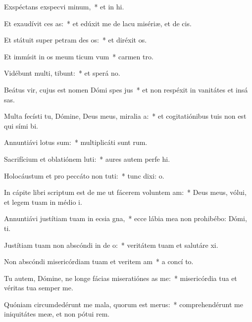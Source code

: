 \item Exspéctans exspecvi minum,~* et in hi.
\item Et exaudívit ces as:~* et edúxit me de lacu misériæ, et de  cis.
\item Et státuit super petram des os:~* et diréxit  os.
\item Et immísit in os meum ticum vum~* carmen  tro.
\item Vidébunt multi,  tibunt:~* et sperá  no.
\item Beátus vir, cujus est nomen Dómi spes jus~* et non respéxit in vanitátes et insá sas.
\item Multa fecísti tu, Dómine, Deus meus, miralia a:~* et cogitatiónibus tuis non est qui sími  bi.
\item Annuntiávi  lotus sum:~* multiplicáti sunt  rum.
\item Sacrifícium et oblatiónem luti:~* aures autem perfe hi.
\item Holocáustum et pro peccáto non tuti:~* tunc dixi:  o.
\item In cápite libri scriptum est de me ut fácerem voluntem am:~* Deus meus, vólui, et legem tuam in médio  i.
\item Annuntiávi justítiam tuam in ecsia gna,~* ecce lábia mea non prohibébo: Dómi,  ti.
\item Justítiam tuam non abscóndi in de o:~* veritátem tuam et salutáre  xi.
\item Non abscóndi misericórdiam tuam et veritem am~* a concí to.
\item Tu autem, Dómine, ne longe fácias miseratiónes as  me:~* misericórdia tua et véritas tua semper  me.
\item Quóniam circumdedérunt me mala, quorum  est merus:~* comprehendérunt me iniquitátes meæ, et non pótui  rem.
